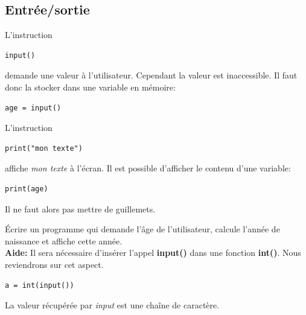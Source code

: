 \documentclass[a4paper,11pt]{article}
\begin{document}
\begin{Form}
\subsection{Entrée/sortie}
L'instruction
\begin{lstlisting}
input()
\end{lstlisting}
demande une valeur à l'utilisateur. Cependant la valeur est inaccessible. Il faut donc la stocker dans une variable en mémoire:
\begin{lstlisting}
age = input()
\end{lstlisting}
L'instruction
\begin{lstlisting}
print("mon texte")
\end{lstlisting}
affiche \emph{mon texte} à l'écran. Il est possible d'afficher le contenu d'une variable:
\begin{lstlisting}
print(age)
\end{lstlisting}
Il ne faut alors pas mettre de guillemets.
\begin{activite}
Écrire un programme qui demande l'âge de l'utilisateur, calcule l'année de naissance et affiche cette année.\\
\textbf{Aide:} Il sera nécessaire d'insérer l'appel \textbf{input()} dans une fonction \textbf{int()}. Nous reviendrons sur cet aspect.
\begin{lstlisting}
a = int(input())
\end{lstlisting}
\end{activite}
\begin{commentprof}
La valeur récupérée par \emph{input} est une chaîne de caractère.
\end{commentprof}

\end{Form}
\end{document}
